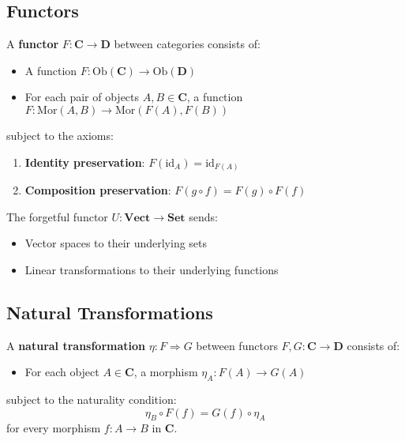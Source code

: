 \subsection{Functors}

\begin{definition}[Functor]
A \textbf{functor} $F: \mathbf{C} \to \mathbf{D}$ between categories consists of:
\begin{itemize}
\item A function $F: \text{Ob}(\mathbf{C}) \to \text{Ob}(\mathbf{D})$
\item For each pair of objects $A, B \in \mathbf{C}$, a function $F: \text{Mor}(A, B) \to \text{Mor}(F(A), F(B))$
\end{itemize}
subject to the axioms:
\begin{enumerate}
\item \textbf{Identity preservation}: $F(\text{id}_A) = \text{id}_{F(A)}$
\item \textbf{Composition preservation}: $F(g \circ f) = F(g) \circ F(f)$
\end{enumerate}
\end{definition}

\begin{example}
The forgetful functor $U: \mathbf{Vect} \to \mathbf{Set}$ sends:
\begin{itemize}
\item Vector spaces to their underlying sets
\item Linear transformations to their underlying functions
\end{itemize}
\end{example}

\subsection{Natural Transformations}

\begin{definition}
A \textbf{natural transformation} $\eta: F \Rightarrow G$ between functors $F, G: \mathbf{C} \to \mathbf{D}$ consists of:
\begin{itemize}
\item For each object $A \in \mathbf{C}$, a morphism $\eta_A: F(A) \to G(A)$
\end{itemize}
subject to the naturality condition:
$$\eta_B \circ F(f) = G(f) \circ \eta_A$$
for every morphism $f: A \to B$ in $\mathbf{C}$.
\end{definition}

